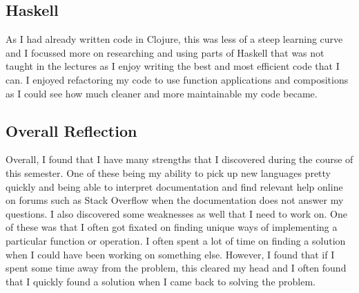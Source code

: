 \subsection*{Haskell}
As I had already written code in Clojure, this was less of a steep learning curve and I focussed more on researching and using parts of Haskell that was not taught in the lectures as I enjoy writing the best and most efficient code that I can. I enjoyed refactoring my code to use function applications and compositions as I could see how much cleaner and more maintainable my code became.
\subsection*{Overall Reflection}
Overall, I found that I have many strengths that I discovered during the course of this semester. One of these being my ability to pick up new languages pretty quickly and being able to interpret documentation and find relevant help online on forums such as Stack Overflow when the documentation does not answer my questions. I also discovered some weaknesses as well that I need to work on. One of these was that I often got fixated on finding unique ways of implementing a particular function or operation. I often spent a lot of time on finding a solution when I could have been working on something else. However, I found that if I spent some time away from the problem, this cleared my head and I often found that I quickly found a solution when I came back to solving the problem.